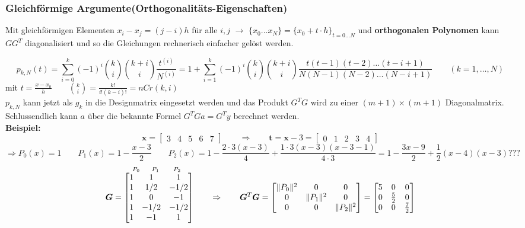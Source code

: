 \subsubsection{Gleichförmige Argumente\quad (Orthogonalitäts-Eigenschaften)} \label{sssec:ls_orthogonal}
Mit gleichförmigen Elementen $x_i - x_j = (j-i) h$ für alle $i,j$ $\rightarrow$ $\{x_0...x_N\} = \{x_0 + t \cdot h\}_{t=0...N}$ und \textbf{orthogonalen Polynomen} kann
$G G^T$ diagonalisiert und so die Gleichungen rechnerisch einfacher gelöst werden.

$$\boxed{p_{k,N}(t) = \sum_{i=0}^k (-1)^i \binom{k}{i} \binom{k+i}{i} \frac{t^{(i)}}{N^{(i)}}=
1+\sum_{i=1}^k (-1)^i \binom{k}{i} \binom{k+i}{i} \frac{t(t-1)(t-2)\ldots(t-i+1)}{N(N-1)(N-2)\ldots(N-i+1)} \qquad (k = 1,\ldots,N)}$$
mit $t=\frac{x-x_0}{h} \qquad \binom{k}{i}=\frac{k!}{i!(k-i)!}=nCr(k,i)$\\
$p_{k,N}$ kann jetzt als $g_{k}$ in die Designmatrix eingesetzt werden und das Produkt $G^T G$ wird
zu einer $(m+1)\times(m+1)$ Diagonalmatrix. Schlussendlich kann $a$ über die bekannte Formel
$G^T G a = G^T y$ berechnet werden.\\

\textbf{Beispiel:}
$$\bm{x}=
	   \begin{bmatrix}
			3&4&5&6&7
	   \end{bmatrix}\qquad \Rightarrow\qquad \bm{t}=\bm{x}-3=
	   \begin{bmatrix}
	   		0&1&2&3&4
	   \end{bmatrix}$$
$$\Rightarrow P_0(x)=1 \qquad P_1(x)= 1-\frac{x-3}{2}\qquad P_2(x)=1-\frac{2\cdot 3 (x-3)}{4}+\frac{1 \cdot 3 (x-3)(x-3 -1)}{4 \cdot 3} = 1-\frac{3x-9}{2}+\frac 12 (x-4)(x-3)???$$
$$\overset{\hspace{0.6cm} P_0 \hspace{0.5cm} P_1 \hspace{0.6cm} P_2}{\bm{G} = \begin{bmatrix}
  1 & 1 	& 1\\
  1 & 1/2 	& -1/2\\
  1 & 0	  	& -1\\
  1 & -1/2 	& -1/2\\
  1 & -1 	& 1\\
\end{bmatrix}}\qquad \Rightarrow\qquad
\bm{G}^T\bm{G}=\begin{bmatrix}
 \| P_0\|^2 	& 0 	& 0\\
  0 		& \|P_1\|^2 	& 0\\
  0 		& 0	  	&\|P_2\|^2\\
\end{bmatrix}
= \begin{bmatrix}
  5 & 0 & 0 \\
  0 & \frac52 & 0\\
  0 & 0 & \frac{7} {2}\\
\end{bmatrix}
$$

